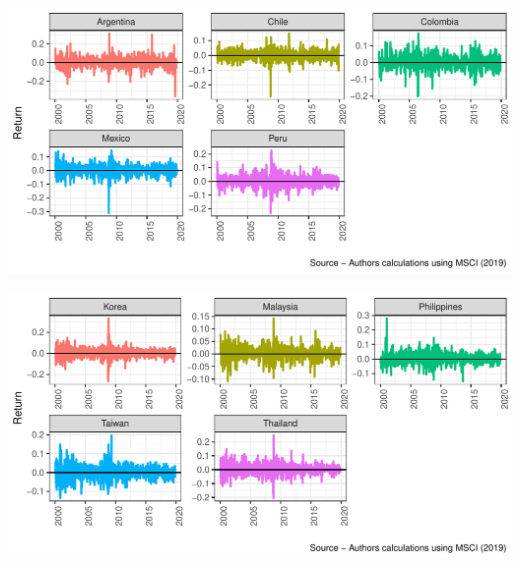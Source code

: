 \documentclass[11pt,preprint, authoryear]{elsarticle}
\let\origfigure\figure
\let\endorigfigure\endfigure
\renewenvironment{figure}[1][2] {
    \expandafter\origfigure\expandafter[H]
} {
    \endorigfigure
}
\numberwithin{equation}{section}
\numberwithin{figure}{section}
\numberwithin{table}{section}
\begin{document}
\begin{figure}[H]

{\centering \includegraphics{Template_files/figure-latex/figreturns2-1} 

}

\caption{Weekly Equity Returns - Latin America \label{figreturns2}}\label{fig:figreturns2}
\end{figure}

\begin{figure}[H]

{\centering \includegraphics{Template_files/figure-latex/figreturns3-1} 

}

\caption{Weekly Equity Returns - Asia \label{figreturns3}}\label{fig:figreturns3}
\end{figure}
\end{document}
